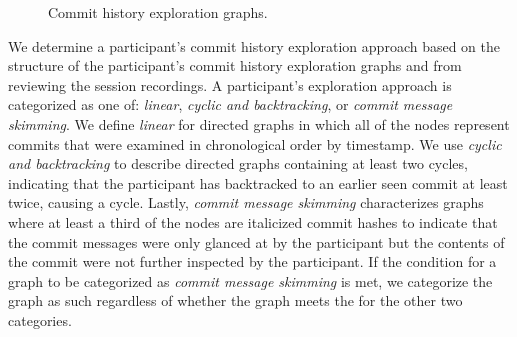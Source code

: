 \begin{figure}
  \centering%
  \qquad
  \caption{
    Commit history exploration graphs.
  }%
  \label{fig:Exploration-Graphs}%
\end{figure}

We determine a participant's commit history exploration approach based on the structure 
of the participant's commit history exploration graphs and from reviewing the session recordings.
A participant's exploration approach is categorized as one of:
\textit{linear}, \textit{cyclic and backtracking}, or \textit{commit message skimming}.
We define \textit{linear} for directed graphs in which all of the nodes represent commits 
that were examined in chronological order by timestamp. 
We use \textit{cyclic and backtracking} to describe directed graphs 
containing at least two cycles, indicating that the participant has backtracked to
an earlier seen commit at least twice, causing a cycle. 
Lastly, \textit{commit message skimming} characterizes graphs where 
at least a third of the nodes are italicized commit hashes to indicate
that the commit messages were only glanced at by the participant but the
contents of the commit were not further inspected by the participant.
If the condition for a graph to be categorized as \textit{commit message skimming} is met,
we categorize the graph as such regardless of whether the graph meets the  for the other two categories.

